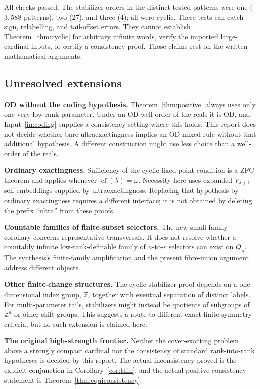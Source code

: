 \documentclass[11pt,letterpaper]{article}
\theoremstyle{definition}
\numberwithin{equation}{section}
\newcommand{\cf}{\operatorname{cf}}
\newcommand{\Z}{\mathbb Z}
\begin{document}
All checks passed. The stabilizer orders in the distinct tested patterns were one ($3{,}588$ patterns), two ($27$), and three ($4$); all were cyclic. These tests can catch sign, relabelling, and tail-offset errors. They cannot establish Theorem~\ref{thm:cyclic} for arbitrary infinite words, verify the imported large-cardinal inputs, or certify a consistency proof. Those claims rest on the written mathematical arguments.

\subsection{Unresolved extensions}

\textbf{OD without the coding hypothesis.} Theorem~\ref{thm:positive} always uses only one very low-rank parameter. Under an OD well-order of the reals it is OD, and Input~\ref{in:coding} supplies a consistency setting where this holds. This report does not decide whether bare ultraexactingness implies an OD mixed rule without that additional hypothesis. A different construction might use less choice than a well-order of the reals.

\textbf{Ordinary exactingness.} Sufficiency of the cyclic fixed-point condition is a ZFC theorem and applies whenever $\cf(\lambda)=\omega$. Necessity here uses expanded $V_{\lambda+1}$ self-embeddings supplied by ultraexactingness. Replacing that hypothesis by ordinary exactingness requires a different interface; it is not obtained by deleting the prefix ``ultra'' from these proofs.

\textbf{Countable families of finite-subset selectors.} The new small-family corollary concerns representative transversals. It does not resolve whether a countably infinite low-rank-definable family of $n$-to-$r$ selectors can exist on $Q_\lambda$. The synthesis's finite-family amplification and the present fibre-union argument address different objects.

\textbf{Other finite-change structures.} The cyclic stabilizer proof depends on a one-dimensional index group, $\Z$, together with eventual separation of distinct labels. For multi-parameter tails, stabilizers might instead be quotients of subgroups of $\Z^d$ or other shift groups. This suggests a route to different exact finite-symmetry criteria, but no such extension is claimed here.

\textbf{The original high-strength frontier.} Neither the cover-exacting problem above a strongly compact cardinal nor the consistency of standard rank-into-rank hypotheses is decided by this report. The actual inconsistency proved is the explicit conjunction in Corollary~\ref{cor:thin}, and the actual positive consistency statement is Theorem~\ref{thm:equiconsistency}.
\end{document}
